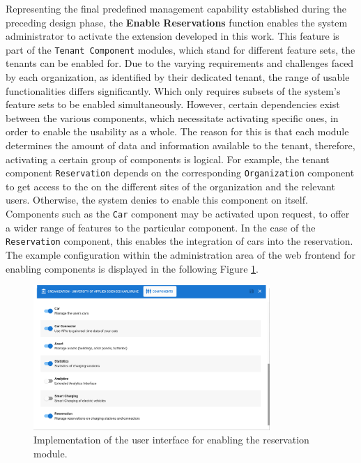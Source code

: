 Representing the final predefined management capability established during the preceding design phase, the \textbf{Enable Reservations} function enables the system administrator to activate the extension developed in this work.
This feature is part of the \texttt{Tenant Component} modules, which stand for different feature sets, the tenants can be enabled for.  
Due to the varying requirements and challenges faced by each organization, as identified by their dedicated tenant, the range of usable functionalities differs significantly. Which only requires subsets of the system's feature sets to be enabled simultaneously.
However, certain dependencies exist between the various components, which necessitate activating specific ones, in order to enable the usability as a whole. The reason for this is that each module determines the amount of data and information available to the tenant, therefore, activating a certain group of components is logical.
For example, the tenant component \texttt{Reservation} depends on the corresponding \texttt{Organization} component to get access to the  on the different sites of the organization and the relevant users. Otherwise, the system denies to enable this component on itself.
Components such as the \texttt{Car} component may be activated upon request, to offer a wider range of features to the particular component. In the case of the \texttt{Reservation} component, this enables the integration of cars into the reservation.
The example configuration within the administration area of the web frontend for enabling components is displayed in the following Figure \ref{fig:enable-reservation-impl}.

\begin{figure}[h]
    \centering
    \includegraphics[width=0.8\textwidth,keepaspectratio]{resources/images/main/6_implementation/screens/enable_reservations/Reservation_Module.png}
    \caption{Implementation of the user interface for enabling the reservation module.}
    \label{fig:enable-reservation-impl}
\end{figure}

